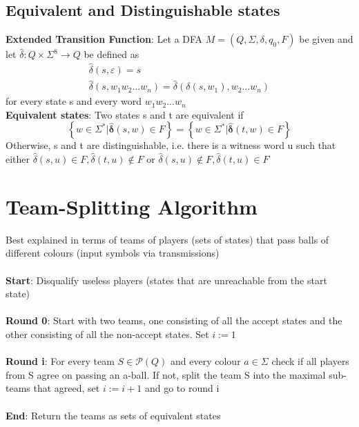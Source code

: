 \documentclass{article}[18pt]
\begin{document}
\subsection{Equivalent and Distinguishable states}
\textbf{Extended Transition Function}: Let a DFA $M=(Q,\Sigma, \delta, q_0, F)$ be given and let $\hat{\delta}: Q\times \Sigma^8\rightarrow Q$ be defined as
\[
\begin{array}{c}
{\hat{\delta}(s, \varepsilon)=s} \\
{\hat{\delta}\left(s, w_{1} w_{2} \ldots w_{n}\right)=\hat{\delta}\left(\delta\left(s, w_{1}\right), w_{2} \ldots w_{n}\right)}
\end{array}
\]
for every state s and every word $w_1w_2...w_n$\\
\textbf{Equivalent states}: Two states s and t are equivalent if
\[
\left\{w \in \Sigma^{*} | \hat{\boldsymbol{\delta}}(s, w) \in F\right\}=\left\{w \in \Sigma^{*} | \hat{\boldsymbol{\delta}}(t, w) \in F\right\}
\]
Otherwise, s and t are distinguishable, i.e. there is a witness word u such that either \(\hat{\delta}(s, u) \in F, \hat{\delta}(t, u) \notin F\) or \(\hat{\delta}(s, u) \notin F, \hat{\delta}(t, u) \in F\)
\section{Team-Splitting Algorithm}
Best explained in terms of teams of players (sets of states) that pass balls of different colours (input symbols via transmissions)\\
\\
\textbf{Start}: Disqualify useless players (states that are unreachable from the start state)\\
\\
\textbf{Round 0}: Start with two teams, one consisting of all the accept states and the other consisting of all the non-accept states. Set $i:=1$\\
\\
\textbf{Round i}: For every team $S\in \mathscr{P}(Q)$ and every colour $a\in \Sigma$ check if all players from S agree on passing an a-ball. If not, split the team S into the maximal sub-teams that agreed, set $i:=i+1$ and go to round i\\
\\
\textbf{End}: Return the teams as sets of equivalent states
\end{document}
